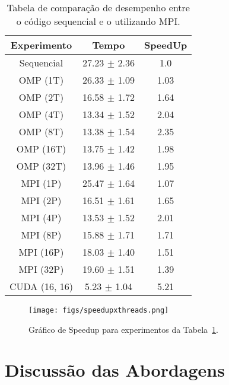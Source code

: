 \documentclass[12pt]{article}
\begin{document}
\begin{table}[htb]
  \centering
  \caption{Tabela de comparação de desempenho entre o código sequencial e o
    utilizando MPI.}\label{tab:Resultados}
  \vspace{0.3cm}
  \begin{tabular}{||c c c||}
    \hline
    Experimento   & Tempo            & SpeedUp \\ [0.5ex]
    \hline\hline
    Sequencial    & 27.23 $\pm$ 2.36 & 1.0     \\
    \hline
    OMP (1T)      & 26.33 $\pm$ 1.09 & 1.03    \\
    \hline
    OMP (2T)      & 16.58 $\pm$ 1.72 & 1.64    \\
    \hline
    OMP (4T)      & 13.34 $\pm$ 1.52 & 2.04    \\
    \hline
    OMP (8T)      & 13.38 $\pm$ 1.54 & 2.35    \\
    \hline
    OMP (16T)     & 13.75 $\pm$ 1.42 & 1.98    \\
    \hline
    OMP (32T)     & 13.96 $\pm$ 1.46 & 1.95    \\
    \hline
    MPI (1P)      & 25.47 $\pm$ 1.64 & 1.07    \\
    \hline
    MPI (2P)      & 16.51 $\pm$ 1.61 & 1.65    \\
    \hline
    MPI (4P)      & 13.53 $\pm$ 1.52 & 2.01    \\
    \hline
    MPI (8P)      & 15.88 $\pm$ 1.71 & 1.71    \\
    \hline
    MPI (16P)     & 18.03 $\pm$ 1.40 & 1.51    \\
    \hline
    MPI (32P)     & 19.60 $\pm$ 1.51 & 1.39    \\
    \hline
    CUDA (16, 16) & 5.23 $\pm$ 1.04  & 5.21    \\
    \hline
  \end{tabular}
\end{table}

\begin{figure}[htb]
  \centering
  \texttt{[image: figs/speedupxthreads.png]}
  \caption{Gráfico de Speedup para experimentos da Tabela~\ref{tab:Resultados}.}\label{fig:speedupxthread}
\end{figure}

\section{Discussão das Abordagens}\label{sec:discussao}
\end{document}
